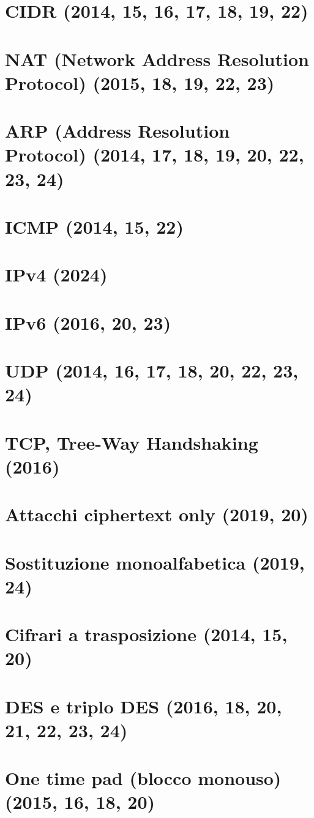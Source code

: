 \documentclass[12pt,oneside,a4paper]{article}
\begin{document}
\section{CIDR (2014, 15, 16, 17, 18, 19, 22)}
\section{NAT (Network Address Resolution Protocol) (2015, 18, 19, 22, 23)}
\section{ARP (Address Resolution Protocol) (2014, 17, 18, 19, 20, 22, 23, 24)}
\section{ICMP (2014, 15, 22)}
\section{IPv4 (2024)}
\section{IPv6 (2016, 20, 23)}
\section{UDP (2014, 16, 17, 18, 20, 22, 23, 24)}
\section{TCP, Tree-Way Handshaking (2016)}
\section{Attacchi ciphertext only (2019, 20)}
\section{Sostituzione monoalfabetica (2019, 24)}
\section{Cifrari a trasposizione (2014, 15, 20)}
\section{DES e triplo DES (2016, 18, 20, 21, 22, 23, 24)}
\section{One time pad (blocco monouso) (2015, 16, 18, 20)}
\end{document}
